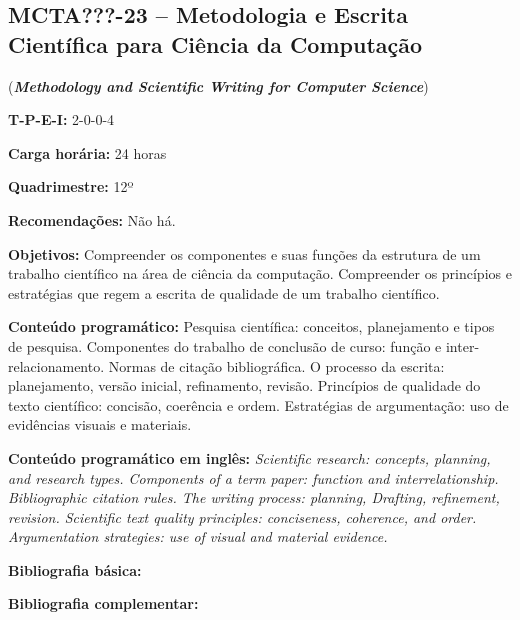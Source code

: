 \documentclass[12pt,a4paper]{article}
\begin{document}
\subsection{MCTA???-23 -- Metodologia e Escrita Científica para Ciência da Computação}
\label{disc:metod}

(\textbf{\textit{Methodology and Scientific Writing for Computer Science}})

\begin{center}
\begin{minipage}{0.85\textwidth}

    \textbf{T-P-E-I:} 2-0-0-4

    \textbf{Carga horária:} 24 horas
    
    \textbf{Quadrimestre:} 12º
    
    \textbf{Recomendações:} Não há.
    
\end{minipage}
\end{center}

\textbf{Objetivos:}
Compreender os componentes e suas funções da estrutura de um trabalho
científico na área de ciência da computação. 
Compreender os princípios e estratégias que regem a escrita de qualidade de um
trabalho científico.

\textbf{Conteúdo programático:}
Pesquisa científica: conceitos, planejamento e tipos de pesquisa. 
Componentes do trabalho de conclusão de curso: função e inter-relacionamento. 
Normas de citação bibliográfica. 
O processo da escrita: planejamento, versão inicial, refinamento, revisão. 
Princípios de qualidade do texto científico: concisão, coerência e ordem. 
Estratégias de argumentação: uso de evidências visuais e materiais.

\textbf{Conteúdo programático em inglês:}
\textit{Scientific research: concepts, planning, and research types.
Components of a term paper: function and interrelationship.
Bibliographic citation rules.
The writing process: planning, Drafting, refinement, revision.
Scientific text quality principles: conciseness, coherence, and order.
Argumentation strategies: use of visual and material evidence.}

\newrefsection
\textbf{Bibliografia básica:}
\nocite{2007-cervo-bervian, 2010-creswell-creswell, 2010-salomon} 
\printbibliography

\newrefsection
\textbf{Bibliografia complementar:}
\nocite{2015-junior, 2014-wazlawick, 2019-medeiros, 2016-wayne, 2001-rubens}

\printbibliography
\end{document}
